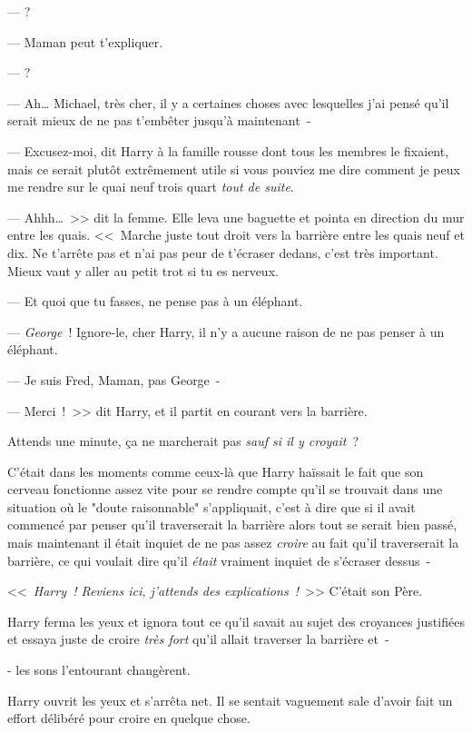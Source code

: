 ---  ?

--- Maman peut t'expliquer.

---  ?

--- Ah… Michael, très cher, il y a certaines choses avec lesquelles j'ai pensé qu'il serait mieux de ne pas t'embêter jusqu'à maintenant~-

--- Excusez-moi, dit Harry à la famille rousse dont tous les membres le fixaient, mais ce serait plutôt extrêmement utile si vous pouviez me dire comment je peux me rendre sur le quai neuf trois quart \emph{tout de suite}.

--- Ahhh…~>> dit la femme. Elle leva une baguette et pointa en direction du mur entre les quais. <<~Marche juste tout droit vers la barrière entre les quais neuf et dix. Ne t'arrête pas et n'ai pas peur de t'écraser dedans, c'est très important. Mieux vaut y aller au petit trot si tu es nerveux.

--- Et quoi que tu fasses, ne pense pas à un éléphant.

--- \emph{George}~! Ignore-le, cher Harry, il n'y a aucune raison de ne pas penser à un éléphant.

--- Je suis Fred, Maman, pas George~-

--- Merci~!~>> dit Harry, et il partit en courant vers la barrière.

Attends une minute, ça ne marcherait pas \emph{sauf si il y croyait}~?

C'était dans les moments comme ceux-là que Harry haïssait le fait que son cerveau fonctionne assez vite pour se rendre compte qu'il se trouvait dans une situation où le "doute  raisonnable" s'appliquait, c'est à dire que si il avait commencé par penser qu'il traverserait la barrière alors tout se serait bien passé, mais maintenant il était inquiet de ne pas assez \emph{croire} au fait qu'il traverserait la barrière, ce qui voulait dire qu'il \emph{était} vraiment inquiet de s'écraser dessus~-

<<~\emph{Harry~! Reviens ici, j'attends des explications~!}~>> C'était son Père.

Harry ferma les yeux et ignora tout ce qu'il savait au sujet des croyances justifiées et essaya juste de croire \emph{très fort} qu'il allait traverser la barrière et~-

- les sons l'entourant changèrent.

Harry ouvrit les yeux et s'arrêta net. Il se sentait vaguement sale d'avoir fait un effort délibéré pour croire en quelque chose.

